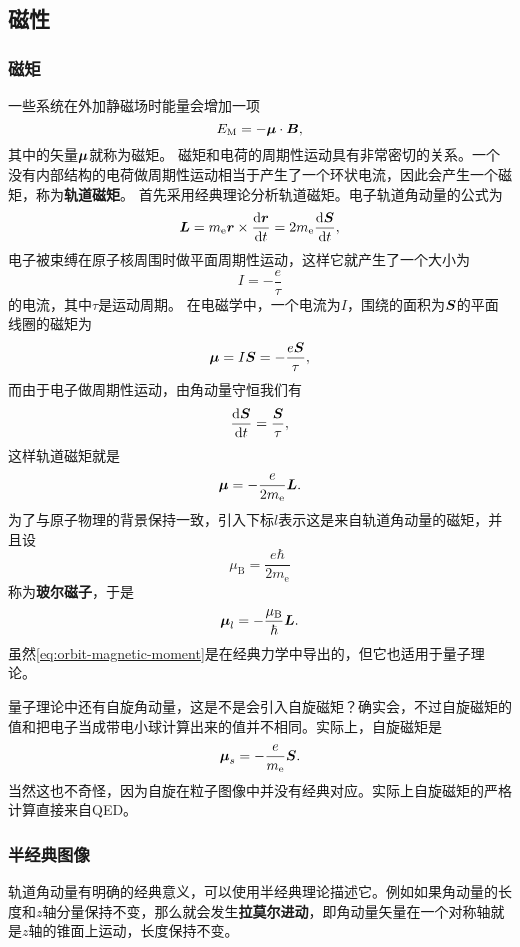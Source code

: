 \documentclass[UTF8, a4paper]{ctexart}
\begin{document}
\subsection{磁性}

\subsubsection{磁矩}

一些系统在外加静磁场时能量会增加一项
\[
    E_\text{M} = - \vb*{\mu} \cdot \vb*{B},
\]
其中的矢量$\vb*{\mu}$就称为磁矩。
磁矩和电荷的周期性运动具有非常密切的关系。一个没有内部结构的电荷做周期性运动相当于产生了一个环状电流，因此会产生一个磁矩，称为\textbf{轨道磁矩}。
首先采用经典理论分析轨道磁矩。电子轨道角动量的公式为
\[
    \vb*{L} = m_\text{e} \vb*{r} \times \dv{\vb*{r}}{t} = 2 m_\text{e} \dv{\vb*{S}}{t},
\]
电子被束缚在原子核周围时做平面周期性运动，这样它就产生了一个大小为
\[
    I = - \frac{e}{\tau}
\]
的电流，其中$\tau$是运动周期。
在电磁学中，一个电流为$I$，围绕的面积为$\vb*{S}$的平面线圈的磁矩为
\[
    \vb*{\mu} = I \vb*{S} = - \frac{e \vb*{S}}{\tau},
\]
而由于电子做周期性运动，由角动量守恒我们有
\[
    \dv{\vb*{S}}{t} = \frac{\vb*{S}}{\tau},
\]
这样轨道磁矩就是
\[
    \vb*{\mu} = - \frac{e}{2m_\text{e}} \vb*{L}.
\]
为了与原子物理的背景保持一致，引入下标$l$表示这是来自轨道角动量的磁矩，并且设
\begin{equation}
    \mu_\text{B} = \frac{e\hbar}{2m_\text{e}}
\end{equation}
称为\textbf{玻尔磁子}，于是
\begin{equation}
    \vb*{\mu}_l = - \frac{\mu_\text{B}}{\hbar} \vb*{L}.
    \label{eq:orbit-magnetic-moment}
\end{equation}
虽然\eqref{eq:orbit-magnetic-moment}是在经典力学中导出的，但它也适用于量子理论。

量子理论中还有自旋角动量，这是不是会引入自旋磁矩？确实会，不过自旋磁矩的值和把电子当成带电小球计算出来的值并不相同。实际上，自旋磁矩是
\begin{equation}
    \vb*{\mu}_s = - \frac{e}{m_\text{e}} \vb*{S}.
\end{equation}
当然这也不奇怪，因为自旋在粒子图像中并没有经典对应。实际上自旋磁矩的严格计算直接来自QED。

\subsubsection{半经典图像}

轨道角动量有明确的经典意义，可以使用半经典理论描述它。例如如果角动量的长度和$z$轴分量保持不变，那么就会发生\textbf{拉莫尔进动}，即角动量矢量在一个对称轴就是$z$轴的锥面上运动，长度保持不变。
\end{document}
